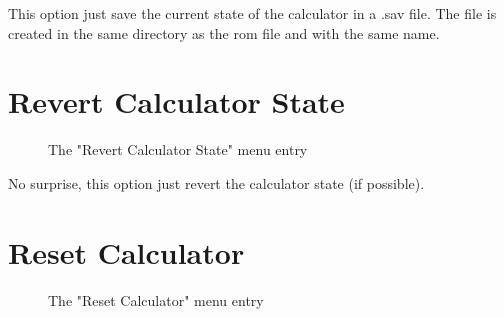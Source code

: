 \documentclass[10pt]{report}
\begin{document}
This option just save the current state of the calculator in a .sav file.\newline
The file is created in the same directory as the rom file and with the same name.\newline
\section{Revert Calculator State}

\begin{figure}[H]
\centering
{}
\caption{The "Revert Calculator State" menu entry}
\end{figure}

No surprise, this option just revert the calculator state (if possible).\newline

\section{Reset Calculator}

\begin{figure}[H]
\centering
{}
\caption{The "Reset Calculator" menu entry}
\end{figure}
\end{document}
